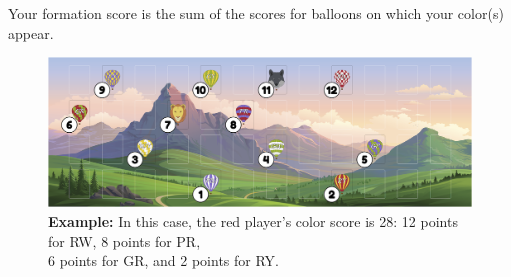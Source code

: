 \documentclass[a6paper, 11pt, parskip=half, DIV=15]{scrartcl}
\newcommand\blfootnote[1]{%
  \begingroup
  \renewcommand\thefootnote{}\footnote{#1}%
  \addtocounter{footnote}{-1}%
  \endgroup
}
\renewcommand{\thefootnote}{\fnsymbol{footnote}}
\begin{document}
Your formation score is the sum of the scores for balloons on which your color(s) appear.

\vfill

\begin{figure}[hb]
\centering
\includegraphics[scale=0.115]{Images/scoring_diagram.png}
\caption*{\textbf{Example:} In this case, the red player's color score is 28: 12 points for {\setmainfont{Playball}RW}, 8 points for {\setmainfont{Playball}PR},\\6 points for {\setmainfont{Playball}GR}, and 2 points for {\setmainfont{Playball}RY}.}
\end{figure}

\end{document}
